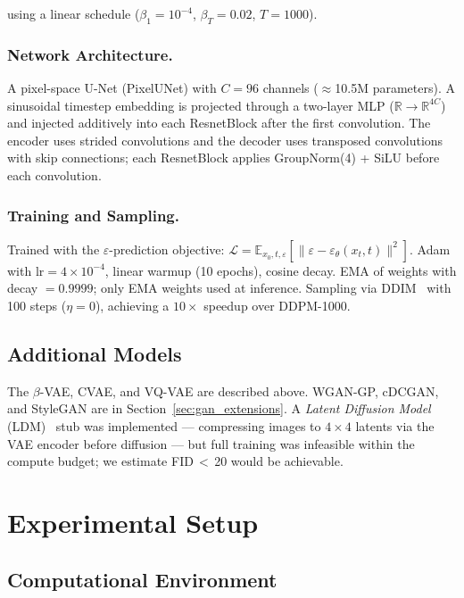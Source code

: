 \documentclass[runningheads]{llncs}
\begin{document}
using a linear schedule ($\beta_1=10^{-4}$, $\beta_T=0.02$, $T=1000$).

\subsubsection{Network Architecture.}

A pixel-space U-Net (PixelUNet) with $C=96$ channels ($\approx$10.5M parameters). A sinusoidal timestep embedding is projected through a two-layer MLP ($\mathbb{R} \to \mathbb{R}^{4C}$) and injected additively into each ResnetBlock after the first convolution. The encoder uses strided convolutions and the decoder uses transposed convolutions with skip connections; each ResnetBlock applies GroupNorm(4) + SiLU before each convolution.

\subsubsection{Training and Sampling.}

Trained with the $\varepsilon$-prediction objective: $\mathcal{L} = \mathbb{E}_{x_0,t,\varepsilon}\!\left[\|\varepsilon - \varepsilon_\theta(x_t,t)\|^2\right]$. Adam with lr$=4{\times}10^{-4}$, linear warmup (10 epochs), cosine decay. EMA of weights with decay $=0.9999$; only EMA weights used at inference. Sampling via DDIM~\cite{song2020} with 100 steps ($\eta=0$), achieving a $10{\times}$ speedup over DDPM-1000.

\subsection{Additional Models}\label{sec:extra}

The $\beta$-VAE, CVAE, and VQ-VAE are described above. WGAN-GP, cDCGAN, and StyleGAN are in Section~\ref{sec:gan_extensions}. A \emph{Latent Diffusion Model} (LDM)~\cite{rombach2022} stub was implemented — compressing images to $4{\times}4$ latents via the VAE encoder before diffusion — but full training was infeasible within the compute budget; we estimate FID\,$<$\,20 would be achievable.

\section{Experimental Setup}\label{sec:setup}

\subsection{Computational Environment}
\end{document}
